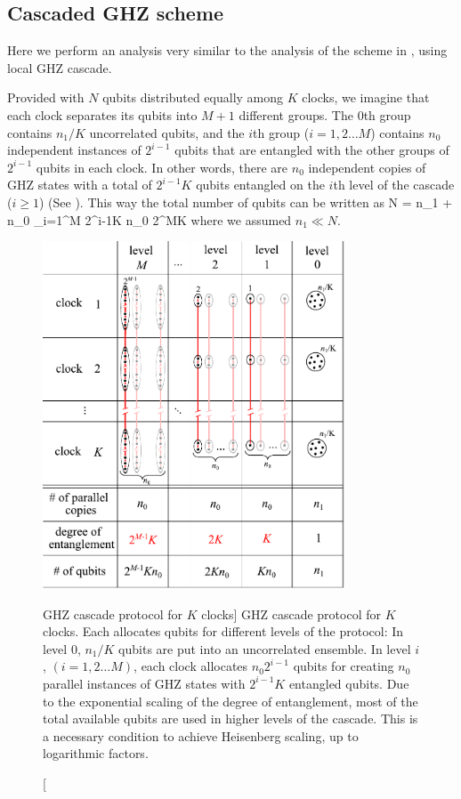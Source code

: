 \subsection{Cascaded GHZ scheme}
Here we perform an analysis very similar to the analysis of the scheme in
\cite{Kessler2014}, using local GHZ cascade.

Provided with $N$ qubits distributed equally among $K$ clocks, we imagine
that each clock separates its qubits into $M+1$ different groups. The $0$th
group contains $n_1/K$ uncorrelated qubits, and the $i$th group ($i=1,2\dots M$)
contains $n_0$ independent instances of $2^{i-1}$ qubits that are entangled with
the other groups of $2^{i-1}$ qubits in each clock. In other words, there
are $n_0$ independent copies of GHZ states with a total of $2^{i-1} K$ qubits
entangled on the $i$th level of the cascade ($i\geq 1$) (See
). This way the total number of qubits can be written as
\bel
	N = n_1 + n_0 \sum_{i=1}^{M} 2^{i-1}K \approx n_0 2^{M}K
\eel
where we assumed $n_1 \ll N$. 
\begin{figure}
\centering
\includegraphics[width=0.8\textwidth]{./figs_Komar2014/fig_supp.pdf}  
\caption
[GHZ cascade protocol for $K$ clocks] 
{
\label{fig:GHZ_cascade}
GHZ cascade protocol for $K$ clocks. Each allocates qubits for different levels
of the protocol: In level 0, $n_1/K$ qubits are put into an uncorrelated
ensemble. In level $i$, $(i=1,2\dots M)$, each clock allocates $n_0 2^{i-1}$
qubits for creating $n_0$ parallel instances of GHZ states with $2^{i-1}K$
entangled qubits. Due to the exponential scaling of the degree of entanglement, most of
the total available qubits are used in higher levels of the cascade. This is a
necessary condition to achieve Heisenberg scaling, up to logarithmic factors.}
\end{figure}
  
